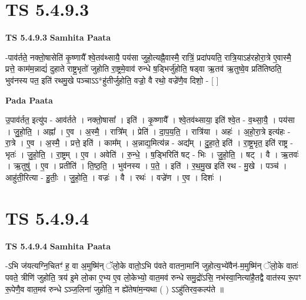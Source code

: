 \documentclass[17pt]{extarticle}
\begin{document}

\section{ TS 5.4.9.3 }

\textbf{TS 5.4.9.3 } \newline
\textbf{Samhita Paata} \newline

-पाव॑र्तते॒ नक्तो॒षासेति॑ कृ॒ष्णायै᳚ श्वे॒तव॑थ्सायै॒ पय॑सा जुहो॒त्यह्नै॒वास्मै॒ रात्रिं॒ प्रदा॑पयति॒ रात्रि॒याऽह॑रहोरा॒त्रे ए॒वास्मै॒ प्रत्ते॒ काम॑म॒न्नाद्यं॑ दुहाते राष्ट्र॒भृतो॑ जुहोति रा॒ष्ट्रमे॒वाव॑ रुन्धे ष॒ड्भिर्जु॑होति॒ षड्वा ऋ॒तव॑ ऋ॒तुष्वे॒व प्रति॑तिष्ठति॒ भुव॑नस्य पत॒ इति॑ रथमु॒खे पञ्चाऽऽ*हु॑तीर्जुहोति॒ वज्रो॒ वै रथो॒ वज्रे॑णै॒व दिशो॒ - [  ] \newline

\textbf{Pada Paata} \newline

उ॒पाव॑र्तत॒ इत्यु॑प - आव॑र्तते । नक्तो॒षासा᳚ । इति॑ । कृ॒ष्णायै᳚ । श्वे॒तव॑थ्साया॒ इति॑ श्वे॒त - व॒थ्सा॒यै॒ । पय॑सा । जु॒हो॒ति॒ । अह्ना᳚ । ए॒व । अ॒स्मै॒ । रात्रि᳚म् । प्रेति॑ । दा॒प॒य॒ति॒ । रात्रि॑या । अहः॑ । अ॒हो॒रा॒त्रे इत्य॑हः - रा॒त्रे । ए॒व । अ॒स्मै॒ । प्रत्ते॒ इति॑ । काम᳚म् । अ॒न्नाद्य॒मित्य॑न्न - अद्य᳚म् । दु॒हा॒ते॒ इति॑ । रा॒ष्ट्र॒भृत॒ इति॑ राष्ट्र - भृतः॑ । जु॒हो॒ति॒ । रा॒ष्ट्रम् । ए॒व । अवेति॑ । रु॒न्धे॒ । ष॒ड्भिरिति॑ षट् - भिः । जु॒हो॒ति॒ । षट् । वै । ऋ॒तवः॑ । ऋ॒तुषु॑ । ए॒व । प्रतीति॑ । ति॒ष्ठ॒ति॒ । भुव॑नस्य । प॒ते॒ । इति॑ । र॒थ॒मु॒ख इति॑ रथ - मु॒खे । पञ्च॑ । आहु॑ती॒रित्या - हु॒तीः॒ । जु॒हो॒ति॒ । वज्रः॑ । वै । रथः॑ । वज्रे॑ण । ए॒व । दिशः॑ ।  \newline





\section{ TS 5.4.9.4 }

\textbf{TS 5.4.9.4 } \newline
\textbf{Samhita Paata} \newline

-ऽभि ज॑यत्यग्नि॒चितꣳ॑ ह॒ वा अ॒मुष्मि॑न् ॅलो॒के वातो॒ऽभि प॑वते वातना॒मानि॑ जुहोत्य॒भ्ये॑वैन॑-म॒मुष्मि॑न् ॅलो॒के वातः॑ पवते॒ त्रीणि॑ जुहोति॒ त्रय॑ इ॒मे लो॒का ए॒भ्य ए॒व लो॒केभ्यो॒ वात॒मव॑ रुन्धे समु॒द्रो॑ऽसि॒ नभ॑स्वा॒नित्या॑है॒तद्वै वात॑स्य रू॒पꣳ रू॒पेणै॒व वात॒मव॑ रुन्धे ऽञ्ज॒लिना॑ जुहोति॒ न ह्ये॑तेषा॑म॒न्यथा ( ) ऽऽहु॑तिरव॒कल्प॑ते ॥ \newline
\end{document}
